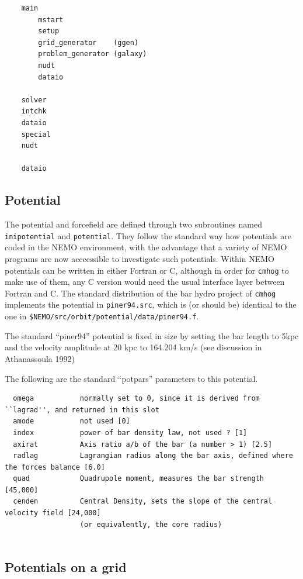 \documentclass[10pt,dvips]{article}
\begin{document}
\begin{verbatim}
    main    
        mstart
	    setup
	    grid_generator    (ggen)
	    problem_generator (galaxy)
	    nudt
        dataio
	
	solver
	intchk
	dataio
	special
	nudt
	
	dataio
\end{verbatim}

\subsection{Potential}

The potential and forcefield are defined through two subroutines
named {\tt inipotential} and {\tt potential}. They follow the
standard way how potentials are coded in the NEMO environment,
with the advantage that a variety of NEMO programs are now 
acccessible to investigate such potentials. Within NEMO potentials
can be written in either Fortran or C, although in order for
{\tt cmhog} to make use of them, any C version would need the
usual interface layer between Fortran and C. The standard distribution
of the bar hydro project of {\tt cmhog} implements the potential
in {\tt piner94.src}, which is (or should be) identical to the
one in {\tt \$NEMO/src/orbit/potential/data/piner94.f}.

The standard ``piner94'' potential is fixed in size by
setting the bar length to 5kpc and the velocity amplitude
at 20 kpc to 164.204 km/s (see discussion in Athanassoula 1992)

The following are the standard ``potpars'' parameters to this potential.

\begin{verbatim}
  omega           normally set to 0, since it is derived from ``lagrad'', and returned in this slot
  amode           not used [0]
  index           power of bar density law, not used ? [1]
  axirat          Axis ratio a/b of the bar (a number > 1) [2.5]
  radlag          Lagrangian radius along the bar axis, defined where the forces balance [6.0]
  quad            Quadrupole moment, measures the bar strength [45,000]
  cenden          Central Density, sets the slope of the central velocity field [24,000]
                  (or equivalently, the core radius)
  
\end{verbatim}

\subsection{Potentials on a grid}
\end{document}
